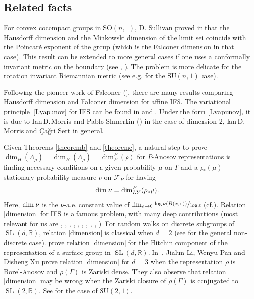 \documentclass[10pt]{amsart}
\newcommand{\NoChangel}[1]{%
\expandafter\let\csname old\string#1\endcsname=#1
\let#1=\relax
\newcommand{#1}{\mathop{\mathcode`l="716C\csname old\string#1\endcsname\mathcode`l="7160}\displaylimits}%
}
\newcommand{\loc}{\mathrm{loc}}\NoChangel{\loc}
\newcommand{\R}{\mathbb{R}}
\newcommand{\F}{\mathcal{F}}
\let\e\varepsilon
\let\G\Gamma
\let\La\Lambda
\DeclareMathOperator{\SL}{SL}
\providecommand{\eg}{e.g.}\providecommand{\ie}{i.e.}\providecommand{\etc}{etc.}\providecommand{\resp}{resp.}\providecommand{\cf}{cf.}
\begin{document}
\subsection{Related facts}
For convex cocompact groups in \({\textrm {SO}}(n,1)\), D. Sullivan proved in \cite{Sul79} that the Hausdorff dimension and the Minkowski dimension of the limit set coincide with the Poincaré exponent of the group (which is the Falconer dimension in that case). This result can be extended to more general cases if one uses a conformally invariant metric on the boundary (see \cite{Lin04}, \cite{DK22}). The problem is more delicate for the rotation invariant Riemannian metric (see \eg \cite{Duf17} for the \({\textrm {SU}}(n,1)\) case).

Following the pioneer work of Falconer (\cite{Fal88}), there are many results comparing Hausdorff dimension and Falconer dimension for affine IFS. The variational principle~\eqref{Lyapunov} for IFS can be found in \cite{Fal88} and \cite{K04}. Under the form \eqref{Lyapunov}, it is due to \hbox{Ian\,D.\,Morris} and Pablo Shmerkin (\cite{MS19}) in the case of dimension 2, \hbox{Ian\,D.\,Morris} and \c Ca\u{g}ri Sert \cite{MS21} in general.

Given Theorems \ref{theoremb} and \ref{theoremc}, a natural step to prove \(\dim_H (\La_\rho) = \dim_B (\La_\rho) = \dim_F^P (\rho) \) for \(P\)-Anosov representations is finding necessary conditions on a given probability \(\mu \) on \(\G\) and a \(\rho_\ast (\mu)\)-stationary probability measure \(\nu \) on \(\F_{P}\) for having
\begin{equation}\label{dimension} \dim_{\loc} \nu = \dim_{LY}^P (\rho_\ast \mu).\end{equation}
Here, \(\dim_{\loc} \nu \) is the \(\nu \)-a.e. constant value of \(\lim_{\e \to 0} \sfrac{\log \nu (B(x,\e))}{\log \e} \) (\cf \cite{LL23}). Relation \eqref{dimension} for IFS is a famous problem, with many deep contributions (most relevant for us are \cite{Fal88}, \cite{JPS07}, \cite{Hoc14}, \cite{BV19}, \cite{Var19}, \cite{BHR19}, \cite{HR19}, \cite{FS22}, \cite{Rap22}, \cite{MS21}). For random walks on discrete subgroups of \(\SL (d,\R) \), relation \eqref{dimension} is classical when \(d=2\) (see \cite{HS17} for the general non-discrete case). \cite{LL23a} prove relation \eqref{dimension} for the Hitchin component of the representation of a surface group in \(\SL (d,\R)\). In~\cite{LPX23}, Jialun Li, Wenyu Pan and Disheng Xu prove relation \eqref{dimension} for \(d=3\) when the representation \(\rho \) is Borel-Anosov and \(\rho (\G)\) is Zariski dense. They also observe that relation \eqref{dimension} may be wrong when the Zariski closure of \(\rho (\G) \) is conjugated to \(\SL(2, \R)\). See \cite{DS22} for the case of \({\textrm {SU}}(2,1)\).
\end{document}
